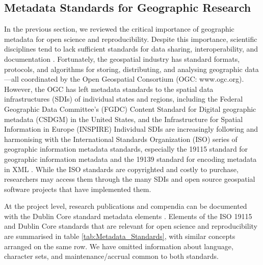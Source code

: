 \documentclass{isprs} %
\begin{document}
\subsection{Metadata Standards for Geographic Research}\label{sec:Metadata}

In the previous section, we reviewed the critical importance of geographic metadata for open science and reproducibility.
Despite this importance, scientific disciplines tend to lack sufficient standards for data sharing, interoperability, and documentation \citep{NASEM2019}.
Fortunately, the geospatial industry has standard formats, protocols, and algorithms for storing, distributing, and analysing geographic data---all coordinated by the Open Geospatial Consortium (OGC: www.ogc.org).
However, the OGC has left metadata standards to the spatial data infrastructures (SDIs) of individual states and regions, including the Federal Geographic Data Committee's (FGDC) Content Standard for Digital geographic metadata (CSDGM) in the United States, and the Infrastructure for Spatial Information in Europe (INSPIRE) \cite{Kim1999,Bartha2011}
Individual SDIs are increasingly following and harmonising with the International Standards Organization (ISO) series of geographic information metadata standards, especially the 19115 standard for geographic information metadata \citep{ISO2014} and the 19139 standard for encoding metadata in XML \citep{ISO2019}.
While the ISO standards are copyrighted and costly to purchase, researchers may access them through the many SDIs and open source geospatial software projects that have implemented them.

At the project level, research publications and compendia can be documented with the Dublin Core\texttrademark{}  standard metadata elements \cite{DCMI2005}. Elements of the ISO 19115 and Dublin Core standards that are relevant for open science and reproducibility are summarised in table \ref{tab:Metadata_Standards}, with similar concepts arranged on the same row. We have omitted information about language, character sets, and maintenance/accrual common to both standards.
\end{document}
